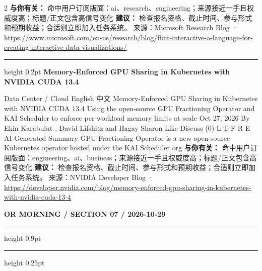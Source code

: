 \documentclass[10.5pt]{ctexart}
\begin{document}
\begin{multicols}{2}
\textbf{与你有关：} 命中用户订阅版面：ai、research、engineering；来源接近一手且权威度高；标题/正文包含高信号变化
\textbf{建议：} 检查报名资格、截止时间、参与形式和预期收益；合适则立即加入任务系统。
{\footnotesize\color{ormuted} 来源：Microsoft Research Blog · \url{https://www.microsoft.com/en-us/research/blog/flint-interactive-a-language-for-creating-interactive-data-visualizations/}}
\vspace{2mm}
\hrule height 0.2pt
\vspace{2mm}
{\large\bfseries Memory-Enforced GPU Sharing in Kubernetes with NVIDIA CUDA 13.4}\par
Data Center / Cloud English 中文 Memory-Enforced GPU Sharing in Kubernetes with NVIDIA CUDA 13.4 Using the open-source GPU Fractioning Operator and KAI Scheduler to enforce per-workload memory limits at scale Oct 27, 2026 By Ekin Karabulut , David Lifshitz and Hagay Sharon Like Discuss (0) L T F R E AI-Generated Summary GPU Fractioning Operator is a new open-source Kubernetes operator hosted under the KAI Scheduler org
\textbf{与你有关：} 命中用户订阅版面：engineering、ai、business；来源接近一手且权威度高；标题/正文包含高信号变化
\textbf{建议：} 检查报名资格、截止时间、参与形式和预期收益；合适则立即加入任务系统。
{\footnotesize\color{ormuted} 来源：NVIDIA Developer Blog · \url{https://developer.nvidia.com/blog/memory-enforced-gpu-sharing-in-kubernetes-with-nvidia-cuda-13-4}}
\end{multicols}
\newpage
{\small\bfseries OR MORNING / SECTION 07 / 2026-10-29}
\vspace{2mm}
\hrule height 0.9pt
\vspace{1.5mm}
\hrule height 0.25pt
\vspace{4mm}
\end{document}
